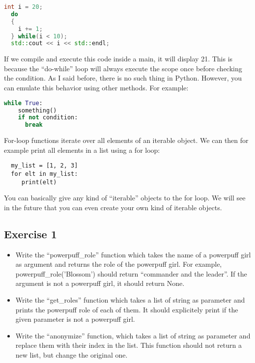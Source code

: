 \begin{lstlisting}[language=C++]
  int i = 20;
  do
  {
    i += 1;
  } while(i < 10);
  std::cout << i << std::endl;
\end{lstlisting}

If we compile and execute this code inside a main, it will display 21. This is because
the ``do-while'' loop will always execute the scope once before checking the condition.
As I said before, there is no such thing in Python. However, you can emulate this behavior
using other methods. For example:

\begin{lstlisting}[language=python]
  while True:
    something()
    if not condition:
      break
\end{lstlisting}

For-loop functions iterate over all elements of an iterable object. We can then for example
print all elements in a list using a for loop:

\begin{lstlisting}
  my_list = [1, 2, 3]
  for elt in my_list:
     print(elt)
\end{lstlisting}

You can basically give any kind of ``iterable'' objects to the for loop. We will see in the future
that you can even create your own kind of iterable objects.

\subsection{Exercise 1}

\begin{itemize}
\item Write the ``powerpuff\_role'' function which takes the name of a powerpuff girl as argument
  and returns the role of the powerpuff girl. For example, powerpuff\_role('Blossom') should return
  ``commander and the leader''. If the argument is not a powerpuff girl, it should return None.
\item Write the ``get\_roles'' function which takes a list of string as parameter and prints the powerpuff role
  of each of them. It should explicitely print if the given parameter is not a powerpuff girl.
\item Write the ``anonymize'' function, which takes a list of string as parameter and replace them with their index
  in the list. This function should not return a new list, but change the original one.
\end{itemize}

